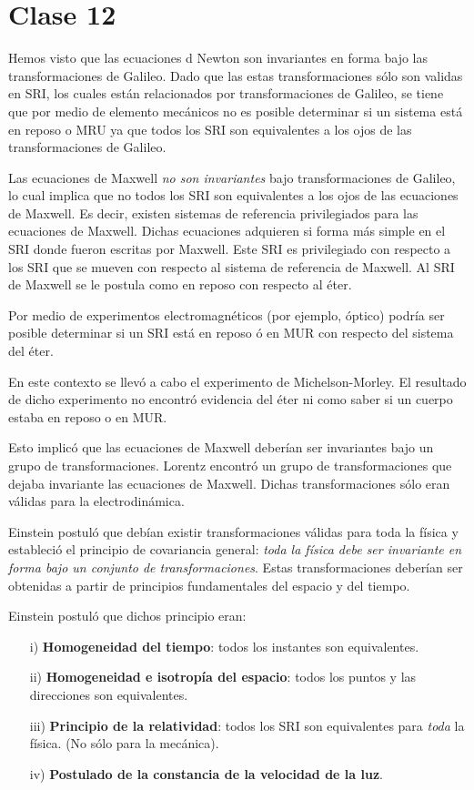 \section{Clase 12}
Hemos visto que las ecuaciones d Newton son invariantes en forma bajo las transformaciones de Galileo. Dado que las estas transformaciones sólo son validas en SRI, los cuales están relacionados por transformaciones de Galileo, se tiene que por medio de elemento mecánicos no es posible determinar si un sistema está en reposo o MRU ya que todos los SRI son equivalentes a los ojos de las transformaciones de Galileo.

Las ecuaciones de Maxwell \textit{no son invariantes} bajo transformaciones de Galileo, lo cual implica que no todos los SRI son equivalentes a los ojos de las ecuaciones de Maxwell. Es decir, existen sistemas de referencia privilegiados para las ecuaciones de Maxwell. Dichas ecuaciones adquieren si forma más simple en el SRI donde fueron escritas por Maxwell. Este SRI es privilegiado con respecto a los SRI que se mueven con respecto al sistema de referencia de Maxwell. Al SRI de Maxwell se le postula como en reposo con respecto al éter.

Por medio de experimentos electromagnéticos (por ejemplo, óptico) podría ser posible determinar si un SRI está en reposo ó en MUR con respecto del sistema del éter.

En este contexto se llevó a cabo el experimento de Michelson-Morley. El resultado de dicho experimento no encontró evidencia del éter ni como saber si un cuerpo estaba en reposo o en MUR.

 Esto implicó que las ecuaciones de Maxwell deberían ser invariantes bajo un grupo de transformaciones. Lorentz encontró un grupo de transformaciones que dejaba invariante las ecuaciones de Maxwell. Dichas transformaciones sólo eran válidas para la electrodinámica.
 
 Einstein postuló que debían existir transformaciones válidas para toda la física y estableció el principio de covariancia general: \textit{toda la física debe ser invariante en forma bajo un conjunto de transformaciones}. Estas transformaciones deberían ser obtenidas a partir de principios fundamentales del espacio y del tiempo.
 
 Einstein postuló que dichos principio eran:
 \begin{enumerate}
 	\item[i)] \textbf{Homogeneidad del tiempo}: todos los instantes son equivalentes.
 	\item[ii)] \textbf{Homogeneidad e isotropía del espacio}: todos los puntos y las direcciones son equivalentes.
 	\item[iii)] \textbf{Principio de la relatividad}: todos los SRI son equivalentes para \textit{toda} la física. (No sólo para la mecánica).
 	\item[iv)] \textbf{Postulado de la constancia de la velocidad de la luz}.
 \end{enumerate}
 
